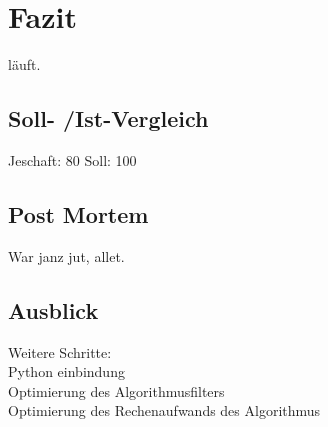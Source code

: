 \section{Fazit}
läuft.

\subsection{Soll- /Ist-Vergleich}
Jeschaft: 80%
Soll: 100%

\subsection{Post Mortem}
War janz jut, allet.

\subsection{Ausblick}
Weitere Schritte:\\
Python einbindung\\
Optimierung des Algorithmusfilters\\
Optimierung des Rechenaufwands des Algorithmus\\
\clearpage
